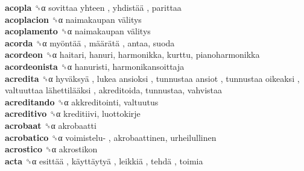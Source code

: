 \textbf{acopla} ␝α   sovittaa yhteen ,  yhdistää , parittaa  \\
\textbf{acoplacion} ␝α   naimakaupan välitys   \\
\textbf{acoplamento} ␝α   naimakaupan välitys   \\
\textbf{acorda} ␝α   myöntää ,  määrätä , antaa, suoda  \\
\textbf{acordeon} ␝α  haitari, hanuri, harmonikka, kurttu, pianoharmonikka  \\
\textbf{acordeonista} ␝α  hanuristi, harmonikansoittaja  \\
\textbf{acredita} ␝α   hyväksyä ,  lukea ansioksi ,  tunnustaa ansiot ,  tunnustaa oikeaksi ,  valtuuttaa lähettilääksi , akreditoida, tunnustaa, vahvistaa  \\
\textbf{acreditando} ␝α  akkreditointi, valtuutus  \\
\textbf{acreditivo} ␝α  kreditiivi, luottokirje  \\
\textbf{acrobaat} ␝α  akrobaatti  \\
\textbf{acrobatico} ␝α   voimistelu- , akrobaattinen, urheilullinen  \\
\textbf{acrostico} ␝α  akrostikon  \\
\textbf{acta} ␝α   esittää ,  käyttäytyä ,  leikkiä ,  tehdä , toimia  \\
